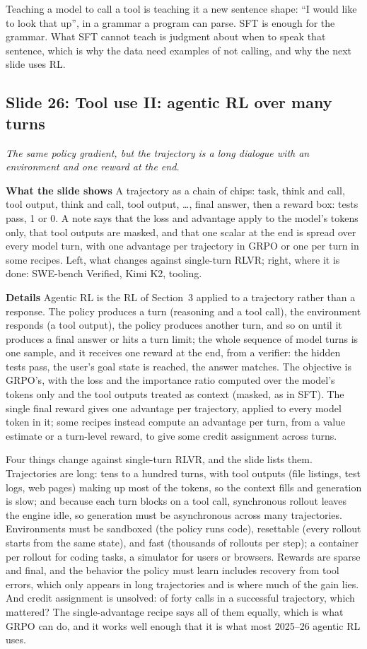 \documentclass[11pt,letterpaper]{article}
\newcommand{\slide}[3]{%
  \subsection[Slide #1: #2]{Slide #1: #2}%
  {\color{muted}\itshape #3\par}\medskip}
\newcommand{\para}[1]{\medskip\noindent\textbf{#1}\quad}
\newenvironment{intuition}{\begin{tcolorbox}[intuitionbox]}{\end{tcolorbox}}
\begin{document}
\begin{intuition}
Teaching a model to call a tool is teaching it a new sentence shape: ``I would like to look that up'', in a grammar a program can parse. SFT is enough for the grammar. What SFT cannot teach is judgment about when to speak that sentence, which is why the data need examples of not calling, and why the next slide uses RL.
\end{intuition}

\slide{26}{Tool use II: agentic RL over many turns}{The same policy gradient, but the trajectory is a long dialogue with an environment and one reward at the end.}

\para{What the slide shows} A trajectory as a chain of chips: task, think and call, tool output, think and call, tool output, \ldots, final answer, then a reward box: tests pass, 1 or 0. A note says that the loss and advantage apply to the model's tokens only, that tool outputs are masked, and that one scalar at the end is spread over every model turn, with one advantage per trajectory in GRPO or one per turn in some recipes. Left, what changes against single-turn RLVR; right, where it is done: SWE-bench Verified, Kimi K2, tooling.

\para{Details} Agentic RL is the RL of Section~3 applied to a trajectory rather than a response. The policy produces a turn (reasoning and a tool call), the environment responds (a tool output), the policy produces another turn, and so on until it produces a final answer or hits a turn limit; the whole sequence of model turns is one sample, and it receives one reward at the end, from a verifier: the hidden tests pass, the user's goal state is reached, the answer matches. The objective is GRPO's, with the loss and the importance ratio computed over the model's tokens only and the tool outputs treated as context (masked, as in SFT). The single final reward gives one advantage per trajectory, applied to every model token in it; some recipes instead compute an advantage per turn, from a value estimate or a turn-level reward, to give some credit assignment across turns.

Four things change against single-turn RLVR, and the slide lists them. Trajectories are long: tens to a hundred turns, with tool outputs (file listings, test logs, web pages) making up most of the tokens, so the context fills and generation is slow; and because each turn blocks on a tool call, synchronous rollout leaves the engine idle, so generation must be asynchronous across many trajectories. Environments must be sandboxed (the policy runs code), resettable (every rollout starts from the same state), and fast (thousands of rollouts per step); a container per rollout for coding tasks, a simulator for users or browsers. Rewards are sparse and final, and the behavior the policy must learn includes recovery from tool errors, which only appears in long trajectories and is where much of the gain lies. And credit assignment is unsolved: of forty calls in a successful trajectory, which mattered? The single-advantage recipe says all of them equally, which is what GRPO can do, and it works well enough that it is what most 2025--26 agentic RL uses.
\end{document}
